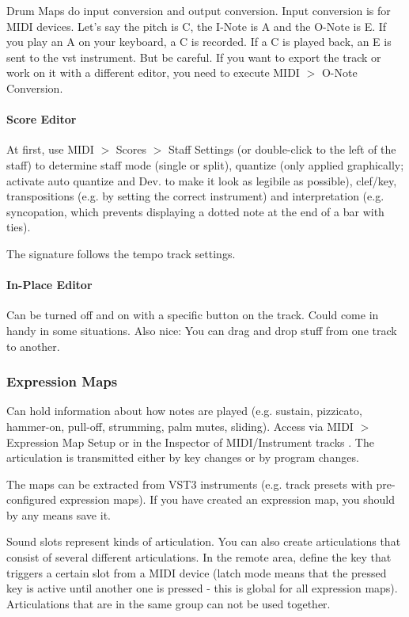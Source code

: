 \documentclass[10pt]{article}
\begin{document}
Drum Maps do input conversion and output conversion. Input conversion is for MIDI devices. Let's say the pitch is C, the I-Note is A and the O-Note is E. If you play an A on your keyboard, a C is recorded. If a C is played back, an E is sent to the vst instrument. But be careful. If you want to export the track or work on it with a different editor, you need to execute MIDI $>$ O-Note Conversion.

\paragraph{Score Editor} At first, use MIDI $>$ Scores $>$ Staff Settings (or double-click to the left of the staff) to determine staff mode (single or split), quantize (only applied graphically; activate auto quantize and Dev. to make it look as legibile as possible), clef/key, transpositions (e.g. by setting the correct instrument) and interpretation (e.g. syncopation, which prevents displaying a dotted note at the end of a bar with ties).

The signature follows the tempo track settings.

\paragraph{In-Place Editor}

Can be turned off and on with a specific button on the track. Could come in handy in some situations. Also nice: You can drag and drop stuff from one track to another.

\subsubsection{Expression Maps}

Can hold information about how notes are played (e.g. sustain, pizzicato, hammer-on, pull-off, strumming, palm mutes, sliding). Access via MIDI $>$ Expression Map Setup or in the Inspector of MIDI/Instrument tracks . The articulation is transmitted either by key changes or by program changes.

The maps can be extracted from VST3 instruments (e.g. track presets with pre-configured expression maps). If you have created an expression map, you should by any means save it.

Sound slots represent kinds of articulation. You can also create articulations that consist of several different articulations. In the remote area, define the key that triggers a certain slot from a MIDI device (latch mode means that the pressed key is active until another one is pressed - this is global for all expression maps). Articulations that are in the same group can not be used together.
\end{document}
